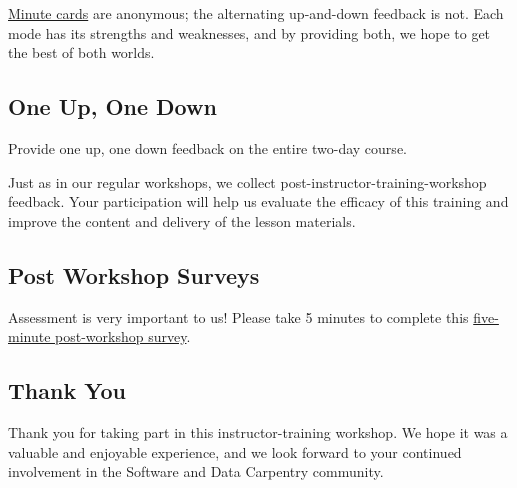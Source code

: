 \href{\{\{ page.root \}\}/06-summarize/}{Minute cards} are anonymous;
the alternating up-and-down feedback is not.
Each mode has its strengths and weaknesses, and by providing both, we hope to get the best of both worlds.

\subsection*{One Up, One Down}

Provide one up, one down feedback on the entire two-day course.

Just as in our regular workshops,
we collect post-instructor-training-workshop feedback.
Your participation will help us evaluate the efficacy of this training
and improve the content and delivery of the lesson materials.

\subsection*{Post Workshop Surveys}

Assessment is very important to us! Please take 5 minutes to complete this \href{\{\{site.training\_post\_survey\}\}}{five-minute post-workshop survey}.

\subsection*{Thank You}

Thank you for taking part in this instructor-training workshop.
We hope it was a valuable and enjoyable experience,
and we look forward to your continued involvement in the Software and Data Carpentry community.

